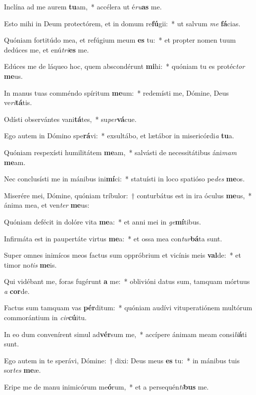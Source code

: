 \item Inclína ad me aurem \textbf{tu}am,~* accélera ut é\textit{ru}\textbf{as} me.
\item Esto mihi in Deum protectórem, et in domum re\textbf{fú}gii:~* ut salvum \textit{me} \textbf{fá}cias.
\item Quóniam fortitúdo mea, et refúgium meum \textbf{es} tu:~* et propter nomen tuum dedúces me, et enú\textit{tri}\textbf{es} me.
\item Edúces me de láqueo hoc, quem abscondérunt \textbf{mi}hi:~* quóniam tu es protéc\textit{tor} \textbf{me}us.
\item In manus tuas comméndo spíritum \textbf{me}um:~* redemísti me, Dómine, Deus ve\textit{ri}\textbf{tá}tis.
\item Odísti observántes vani\textbf{tá}tes,~* su\textit{per}\textbf{vá}cue.
\item Ego autem in Dómino spe\textbf{rá}vi:~* exsultábo, et lætábor in misericórdi\textit{a} \textbf{tu}a.
\item Quóniam respexísti humilitátem \textbf{me}am,~* salvásti de necessitátibus áni\textit{mam} \textbf{me}am.
\item Nec conclusísti me in mánibus ini\textbf{mí}ci:~* statuísti in loco spatióso pe\textit{des} \textbf{me}os.
\item Miserére mei, Dómine, quóniam tríbulor:~† conturbátus est in ira óculus \textbf{me}us,~* ánima mea, et ven\textit{ter} \textbf{me}us:
\item Quóniam defécit in dolóre vita \textbf{me}a:~* et anni mei in \textit{ge}\textbf{mí}tibus.
\item Infirmáta est in paupertáte virtus \textbf{me}a:~* et ossa mea con\textit{tur}\textbf{bá}ta sunt.
\item Super omnes inimícos meos factus sum oppróbrium et vicínis meis \textbf{val}de:~* et timor no\textit{tis} \textbf{me}is.
\item Qui vidébant me, foras fugérunt \textbf{a} me:~* oblivióni datus sum, tamquam mórtuus \textit{a} \textbf{cor}de.
\item Factus sum tamquam vas \textbf{pér}ditum:~* quóniam audívi vituperatiónem multórum commorántium in \textit{cir}\textbf{cú}itu.
\item In eo dum convenírent simul ad\textbf{vér}sum me,~* accípere ánimam meam consi\textit{li}\textbf{á}ti sunt.
\item Ego autem in te sperávi, Dómine:~† dixi: Deus meus \textbf{es} tu:~* in mánibus tuis sor\textit{tes} \textbf{me}æ.
\item Eripe me de manu inimicórum me\textbf{ó}rum,~* et a persequén\textit{ti}\textbf{bus} me.
